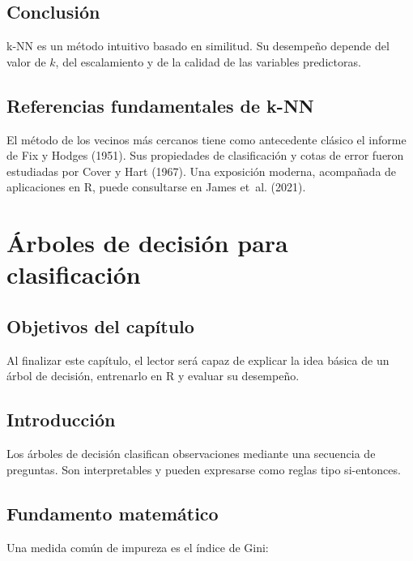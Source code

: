 \documentclass[
  spanish,
  10.5pt,
  letterpaper,
  openany,
  headings=big]{scrbook}
\begin{document}
\section{Conclusión}\label{conclusiuxf3n-3}

k-NN es un método intuitivo basado en similitud. Su desempeño depende
del valor de \(k\), del escalamiento y de la calidad de las variables
predictoras.

\section{Referencias fundamentales de
k-NN}\label{referencias-fundamentales-de-k-nn}

El método de los vecinos más cercanos tiene como antecedente clásico el
informe de Fix y Hodges (1951). Sus propiedades de clasificación y cotas
de error fueron estudiadas por Cover y Hart (1967). Una exposición
moderna, acompañada de aplicaciones en R, puede consultarse en James
et~al. (2021).


\chapter{Árboles de decisión para
clasificación}\label{uxe1rboles-de-decisiuxf3n-para-clasificaciuxf3n}

\section{Objetivos del capítulo}\label{objetivos-del-capuxedtulo-6}

Al finalizar este capítulo, el lector será capaz de explicar la idea
básica de un árbol de decisión, entrenarlo en R y evaluar su desempeño.

\section{Introducción}\label{introducciuxf3n-2}

Los árboles de decisión clasifican observaciones mediante una secuencia
de preguntas. Son interpretables y pueden expresarse como reglas tipo
si-entonces.

\section{Fundamento matemático}\label{fundamento-matemuxe1tico-1}

Una medida común de impureza es el índice de Gini:
\end{document}
